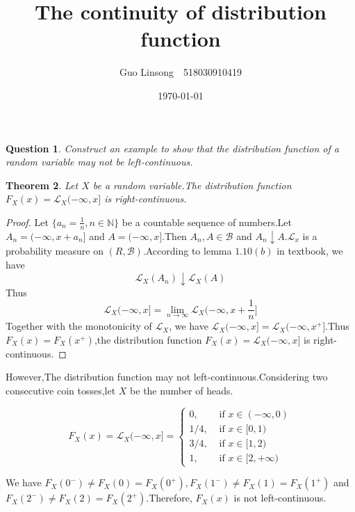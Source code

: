 \documentclass{article}
\title{The continuity of distribution function}
\author{Guo Linsong~~518030910419}
\date{\today}
\newtheorem{theorem}{Theorem}
\newtheorem{question}[theorem]{Question}
\begin{document}
    \maketitle

\begin{tcolorbox}
    \begin{question}\label{question}
    Construct an example to show that the distribution function of a random variable may not be left-continuous.
   \end{question}
\end{tcolorbox}



\begin{theorem}
Let $X$ be a random variable.The distribution function $F_X(x)=\mathcal{L}_X(-\infty,x]$ is right-continuous.
\end{theorem}

\begin{proof}
    Let $\{a_n=\frac{1}{n},n\in\mathbb{N}\}$ be a countable sequence of numbers.Let $A_n=(-\infty,x+a_n]$ and $A=(-\infty,x]$.Then $A_n,A\in \mathcal{B}$ and $A_n\downarrow A$.$\mathcal{L}_x$ is a probability measure on $(R,\mathcal{B})$.According to lemma $1.10(b)$ in textbook, we have $$\mathcal{L}_X(A_n)\downarrow\mathcal{L}_X(A)$$
    Thus $$\mathcal{L}_X(-\infty, x]=\lim\limits_{n\rightarrow\infty}\mathcal{L}_X(-\infty, x+\frac{1}{n}]$$
    Together with the monotonicity of $\mathcal{L}_X$, we have $\mathcal{L}_X(-\infty, x]=\mathcal{L}_X(-\infty, x^{+}]$.Thus $F_X(x)=F_X(x^{+})$,the distribution function $F_X(x)=\mathcal{L}_X(-\infty,x]$ is right-continuous.
\end{proof}

However,The distribution function may not left-continuous.Considering two consecutive coin tosses,let $X$ be the number of heads.

$$F_{X}(x)=  \mathcal{L}_X(-\infty, x]=\left\{\begin{array}{ll}
0, & \text { if } x\in(-\infty,0) \\
1 / 4, & \text { if } x \in [0,1) \\
3 / 4, & \text { if } x \in [1,2) \\
1, & \text { if } x \in [2,+\infty)
\end{array}\right.$$

We have $F_X(0^-)\neq F_X(0)=F_X(0^+),F_X(1^-)\neq F_X(1)=F_X(1^+)$ and $F_X(2^-)\neq F_X(2)=F_X(2^+)$.Therefore, $F_X(x)$ is not left-continuous.
\end{document}
